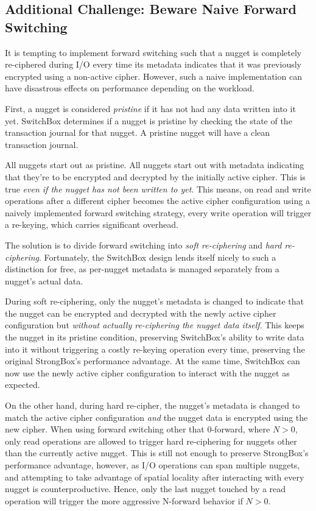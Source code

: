 \subsection{Additional Challenge: Beware Naive Forward Switching}

It is tempting to implement forward switching such that a nugget is completely
re-ciphered during I/O every time its metadata indicates that it was previously
encrypted using a non-active cipher. However, such a naive implementation can
have disastrous effects on performance depending on the workload.

First, a nugget is considered \emph{pristine} if it has not had any data written
into it yet. SwitchBox determines if a nugget is pristine by checking the state
of the transaction journal for that nugget. A pristine nugget will have a clean
transaction journal.

All nuggets start out as pristine. All nuggets start out with metadata
indicating that they're to be encrypted and decrypted by the initially active
cipher. This is true \emph{even if the nugget has not been written to yet}. This
means, on read and write operations after a different cipher becomes the active
cipher configuration using a naively implemented forward switching strategy,
every write operation will trigger a re-keying, which carries significant
overhead.

The solution is to divide forward switching into \emph{soft re-ciphering} and
\emph{hard re-ciphering}. Fortunately, the SwitchBox design lends itself nicely
to such a distinction for free, as per-nugget metadata is managed separately
from a nugget's actual data.

During soft re-ciphering, only the nugget's metadata is changed to indicate that
the nugget can be encrypted and decrypted with the newly active cipher
configuration but \emph{without actually re-ciphering the nugget data itself}.
This keeps the nugget in its pristine condition, preserving SwitchBox's ability
to write data into it without triggering a costly re-keying operation every
time, preserving the original StrongBox's performance advantage. At the same
time, SwitchBox can now use the newly active cipher configuration to interact
with the nugget as expected.

On the other hand, during hard re-cipher, the nugget's metadata is changed to
match the active cipher configuration \emph{and} the nugget data is encrypted
using the new cipher. When using forward switching other that 0-forward,
 where $N > 0$, only read operations are allowed to trigger hard
re-ciphering for nuggets other than the currently active nugget. This is still
not enough to preserve StrongBox's performance advantage, however, as I/O
operations can span multiple nuggets, and attempting to take advantage of
spatial locality after interacting with every nugget is counterproductive.
Hence, only the last nugget touched by a read operation will trigger the more
aggressive N-forward behavior if $N > 0$.

